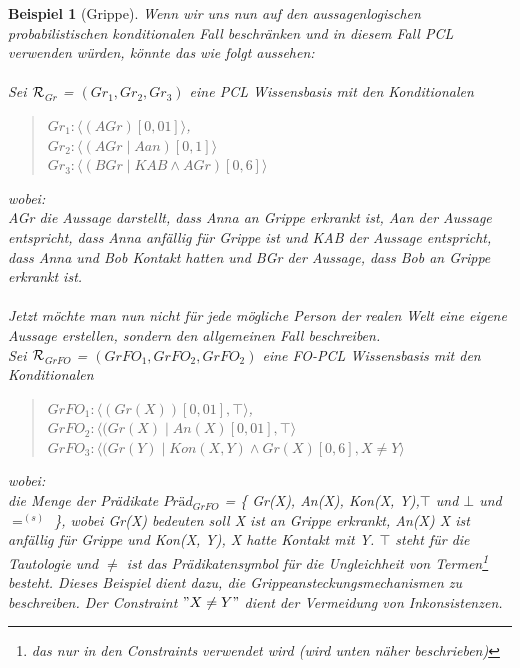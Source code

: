 \documentclass[a4paper, 11pt]{book}
\newtheorem{Bsp}{Beispiel}[section]
\begin{document}
\begin{Bsp}[Grippe]
Wenn wir uns nun auf den aussagenlogischen probabilistischen konditionalen Fall beschränken und in diesem Fall PCL  verwenden würden, könnte das wie folgt aussehen:\\
\\
Sei $ \cal{R} $$_{Gr}  $ = $ (Gr_{1}, Gr_{2}, Gr_{3})  $ eine PCL Wissensbasis mit den Konditionalen 
\begin{quote}
$ Gr_{1}  :  \langle (AGr)[0,01]\rangle $,\\
$ Gr_{2} : \langle (AGr \mid Aan)[0,1]\rangle$\\
$ Gr_{3} : \langle (BGr \mid KAB \wedge AGr )[0,6]\rangle$\\
\end{quote}
wobei:\\
AGr die Aussage darstellt, dass Anna an Grippe erkrankt ist, Aan der Aussage entspricht, dass Anna anfällig für Grippe ist und KAB der Aussage entspricht, dass Anna und Bob Kontakt hatten und BGr der Aussage, dass Bob an Grippe erkrankt ist. 
\\
\\
Jetzt möchte man nun nicht für jede mögliche Person der realen Welt eine eigene Aussage erstellen, sondern den allgemeinen Fall beschreiben.
\\
Sei $ \cal{R} $$_{GrFO} $ = $ (GrFO_{1}, GrFO_{2}, GrFO_{2})  $ eine FO-PCL Wissensbasis mit den Konditionalen 
\begin{quote}
$ GrFO_{1}  :  \langle (Gr(X))[0,01], \top \rangle $,\\
$ GrFO_{2} : \langle (Gr(X) \mid An(X)[0,01], \top \rangle$\\
$ GrFO_{3} : \langle (Gr(Y) \mid Kon(X, Y) \wedge Gr(X )[0,6], X \neq Y \rangle$\\
\end{quote}
wobei:\\
die Menge der Prädikate $Präd_{GrFO}$  = \{ Gr(X), An(X), Kon(X, Y),$ \top $    und $ \bot  $ und $ =^{(s)}$ \}, wobei Gr(X) bedeuten soll X ist an Grippe erkrankt, An(X) X ist anfällig für Grippe und Kon(X, Y),  X hatte Kontakt mit Y. $ \top $ steht für die Tautologie und $ \neq  $ ist das Prädikatensymbol für die Ungleichheit von Termen\footnote{das nur in den Constraints verwendet wird (wird unten näher beschrieben)} besteht. Dieses Beispiel dient dazu, die Grippeansteckungsmechanismen zu beschreiben. Der Constraint $  "{} X \neq Y "{} $ dient der Vermeidung von Inkonsistenzen.


\end{Bsp}
\end{document}
